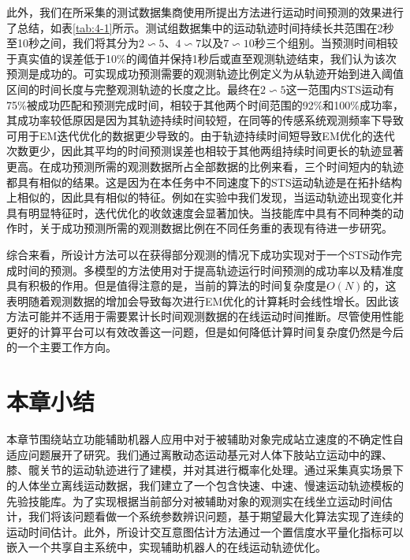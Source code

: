 此外，我们在所采集的测试数据集商使用所提出方法进行运动时间预测的效果进行了总结，如表\ref{tab:4-1}所示。测试组数据集中的运动轨迹时间持续长共范围在2秒至10秒之间，我们将其分为$2\backsim 5$、$4\backsim 7$以及$7\backsim 10$秒三个组别。当预测时间相较于真实值的误差低于10\%的阈值并保持1秒后或直至观测轨迹结束，我们认为该次预测是成功的。可实现成功预测需要的观测轨迹比例定义为从轨迹开始到进入阈值区间的时间长度与完整观测轨迹的长度之比。最终在$2\backsim 5$这一范围内STS运动有75\%被成功匹配和预测完成时间，相较于其他两个时间范围的92\%和100\%成功率，其成功率较低原因是因为其轨迹持续时间较短，在同等的传感系统观测频率下导致可用于EM迭代优化的数据更少导致的。由于轨迹持续时间短导致EM优化的迭代次数更少，因此其平均的时间预测误差也相较于其他两组持续时间更长的轨迹显著更高。在成功预测所需的观测数据所占全部数据的比例来看，三个时间短内的轨迹都具有相似的结果。这是因为在本任务中不同速度下的STS运动轨迹是在拓扑结构上相似的，因此具有相似的特征。例如在实验中我们发现，当运动轨迹出现变化并具有明显特征时，迭代优化的收敛速度会显著加快。当技能库中具有不同种类的动作时，关于成功预测所需的观测数据比例在不同任务重的表现有待进一步研究。

综合来看，所设计方法可以在获得部分观测的情况下成功实现对于一个STS动作完成时间的预测。多模型的方法使用对于提高轨迹运行时间预测的成功率以及精准度具有积极的作用。但是值得注意的是，当前的算法的时间复杂度是$O(N)$的，这表明随着观测数据的增加会导致每次进行EM优化的计算耗时会线性增长。因此该方法可能并不适用于需要累计长时间观测数据的在线运动时间推断。尽管使用性能更好的计算平台可以有效改善这一问题，但是如何降低计算时间复杂度仍然是今后的一个主要工作方向。

\section{本章小结}
本章节围绕站立功能辅助机器人应用中对于被辅助对象完成站立速度的不确定性自适应问题展开了研究。我们通过离散动态运动基元对人体下肢站立运动中的踝、膝、髋关节的运动轨迹进行了建模，并对其进行概率化处理。通过采集真实场景下的人体坐立离线运动数据，我们建立了一个包含快速、中速、慢速运动轨迹模板的先验技能库。为了实现根据当前部分对被辅助对象的观测实在线坐立运动时间估计，我们将该问题看做一个系统参数辨识问题，基于期望最大化算法实现了连续的运动时间估计。此外，所设计交互意图估计方法通过一个置信度水平量化指标可以嵌入一个共享自主系统中，实现辅助机器人的在线运动轨迹优化。
